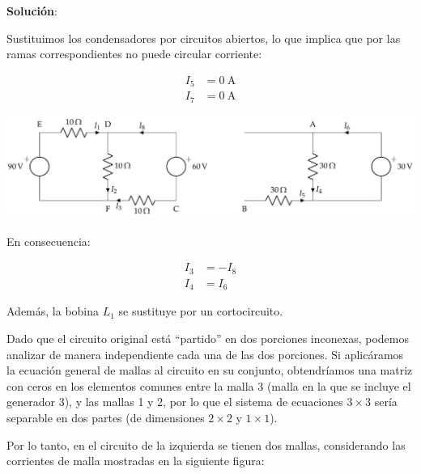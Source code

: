 \documentclass[10pt]{article}
\begin{document}

\hrulefill

\vspace{5mm}
\textbf{Solución}:
\vspace{4mm}

Sustituimos los condensadores por circuitos abiertos, lo que implica que por las ramas correspondientes no puede circular corriente:

\vspace{-2mm}
\begin{align*}
  I_5 &= \qty{0}{\ampere}\\
  I_7 &= \qty{0}{\ampere}
\end{align*}

\vspace{-12mm}
\begin{center}
  \includegraphics[scale=0.99]{figs/BT1_10_mod.pdf}
\end{center}

En consecuencia:

\vspace{-5mm}
\begin{align*}
  I_3 &= -I_8\\
  I_4 &= I_6
\end{align*}

\vspace{2mm}
Además, la bobina $L_1$ se sustituye por un cortocircuito.

Dado que el circuito original está ``partido'' en dos porciones inconexas, podemos analizar de manera independiente cada una de las dos porciones. Si aplicáramos la ecuación general de mallas al circuito en su conjunto, obtendríamos una matriz con ceros en los elementos comunes entre la malla 3 (malla en la que se incluye el generador 3), y las mallas 1 y 2, por lo que el sistema de ecuaciones $3\times 3$ sería separable en dos partes (de dimensiones $2\times 2$ y $1\times 1$).

\vspace{5mm}
Por lo tanto, en el circuito de la izquierda se tienen dos mallas, considerando las corrientes de malla mostradas en la siguiente figura:
\end{document}

